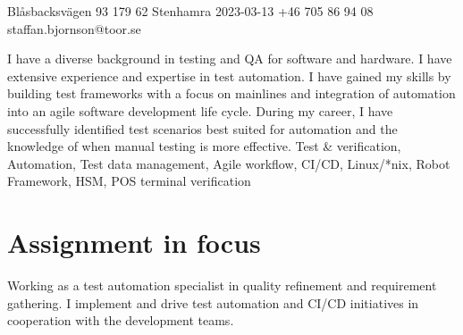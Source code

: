 \documentclass{sobCV}[2015/09/08]
\begin{document}
       {Blåsbacksvägen 93}
       {179 62 Stenhamra}
       {2023-03-13}
       {+46 705 86 94 08}
       {staffan.bjornson@toor.se}






   {
       I have a diverse background in testing and QA for software and
       hardware.  I have extensive experience and expertise in test automation.
       I have gained my skills by building test frameworks with a focus on
       mainlines and integration of automation into an agile software
       development life cycle. During my career, I have successfully identified
       test scenarios best suited for automation and the knowledge of
       when manual testing is more effective. 
   }{
       Test \& verification,
       Automation, 
       Test data management,
       Agile workflow,
       CI/CD,
       Linux/*nix,
       Robot Framework,
       HSM,
       POS terminal verification
    }


\section{Assignment in focus}
    Working as a test automation specialist in quality refinement and
    requirement gathering. I implement and drive test automation and CI/CD
    initiatives in cooperation with the development teams.
\end{document}
